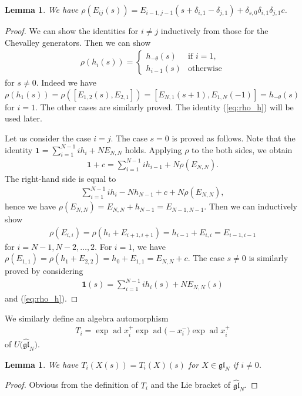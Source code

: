 \documentclass[11pt]{article}
\newtheorem{lem}[thm]{Lemma}
\theoremstyle{definition}
\numberwithin{equation}{section}
\DeclareMathOperator{\ad}{ad}
\newcommand{\gl}{\mathfrak{gl}}
\newcommand{\bfid}{\mathbf{1}}
\begin{document}
\begin{lem}\label{lem:rho}We have $\rho(E_{ij}(s)) = E_{i-1,j-1}(s+\delta_{i,1}-\delta_{j,1}) + \delta_{s,0}\delta_{i,1}\delta_{j,1}c$.
\end{lem}
\begin{proof}We can show the identities for $i \neq j$ inductively from those for the Chevalley generators. Then we can show
\begin{gather}
\rho(h_i(s)) = \begin{cases}
h_{-\theta}(s) & \text{if $i=1$},\\
h_{i-1}(s) & \text{otherwise}
\end{cases}\label{eq:rho_h}
\end{gather}
for $s \neq 0$. Indeed we have $\rho(h_1(s)) = \rho([E_{1,2}(s), E_{2,1}]) = [E_{N,1}(s+1), E_{1,N}(-1)] = h_{-\theta}(s)$ for $i=1$. The other cases are similarly proved. The identity (\ref{eq:rho_h}) will be used later.

Let us consider the case $i = j$. The case $s=0$ is proved as follows. Note that the identity $\bfid = \sum\limits_{i=1}^{N-1} i h_i + N E_{N,N}$ holds. Applying $\rho$ to the both sides, we obtain
\begin{gather*}
\bfid + c = \sum_{i=1}^{N-1} i h_{i-1} + N \rho(E_{N,N}).
\end{gather*}
The right-hand side is equal to
\begin{gather*}
\sum_{i=1}^{N-1} i h_i - N h_{N-1} + c + N \rho(E_{N,N}),
\end{gather*}
hence we have $\rho(E_{N,N}) = E_{N,N} + h_{N-1} = E_{N-1,N-1}$. Then we can inductively show
\begin{gather*}
\rho(E_{i,i}) = \rho(h_i + E_{i+1,i+1}) = h_{i-1} + E_{i,i} = E_{i-1,i-1}
\end{gather*}
for $i=N-1,N-2,\ldots,2$. For $i=1$, we have $\rho(E_{1,1}) = \rho(h_1 + E_{2,2}) = h_{0} + E_{1,1} = E_{N,N} + c$. The case $s \neq 0$ is similarly proved by considering
\begin{gather*}
\bfid(s) = \sum_{i=1}^{N-1} i h_i(s) + N E_{N,N}(s)
\end{gather*}
and (\ref{eq:rho_h}).
\end{proof}

We similarly define an algebra automorphism
\begin{gather*}
T_i = \exp\ad x_i^+ \exp\ad\big({-}x_i^-\big) \exp\ad x_i^+
\end{gather*}
of $U\big(\hat{\gl}_N\big)$.

\begin{lem}\label{lem:higher}We have $T_i(X(s))=T_i(X)(s)$ for $X \in \gl_N$ if $i \neq 0$.
\end{lem}
\begin{proof}Obvious from the definition of $T_i$ and the Lie bracket of $\hat{\gl}_N$.
\end{proof}
\end{document}
